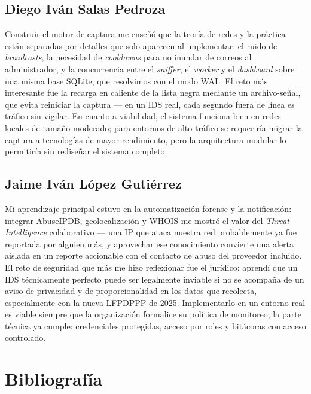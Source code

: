 \documentclass[12pt,letterpaper]{report}
\begin{document}
\section{Diego Iván Salas Pedroza}

Construir el motor de captura me enseñó que la teoría de redes y la práctica
están separadas por detalles que solo aparecen al implementar: el ruido de
\textit{broadcasts}, la necesidad de \textit{cooldowns} para no inundar de
correos al administrador, y la concurrencia entre el \textit{sniffer}, el
\textit{worker} y el \textit{dashboard} sobre una misma base SQLite, que
resolvimos con el modo WAL. El reto más interesante fue la recarga en
caliente de la lista negra mediante un archivo-señal, que evita reiniciar la
captura --- en un IDS real, cada segundo fuera de línea es tráfico sin
vigilar. En cuanto a viabilidad, el sistema funciona bien en redes locales
de tamaño moderado; para entornos de alto tráfico se requeriría migrar la
captura a tecnologías de mayor rendimiento, pero la arquitectura modular lo
permitiría sin rediseñar el sistema completo.

\section{Jaime Iván López Gutiérrez}

Mi aprendizaje principal estuvo en la automatización forense y la
notificación: integrar AbuseIPDB, geolocalización y WHOIS me mostró el valor
del \textit{Threat Intelligence} colaborativo --- una IP que ataca nuestra
red probablemente ya fue reportada por alguien más, y aprovechar ese
conocimiento convierte una alerta aislada en un reporte accionable con el
contacto de abuso del proveedor incluido. El reto de seguridad que más me
hizo reflexionar fue el jurídico: aprendí que un IDS técnicamente perfecto
puede ser legalmente inviable si no se acompaña de un aviso de privacidad y
de proporcionalidad en los datos que recolecta, especialmente con la nueva
LFPDPPP de 2025. Implementarlo en un entorno real es viable siempre que la
organización formalice su política de monitoreo; la parte técnica ya cumple:
credenciales protegidas, acceso por roles y bitácoras con acceso controlado.

\chapter*{Bibliografía}
\end{document}
